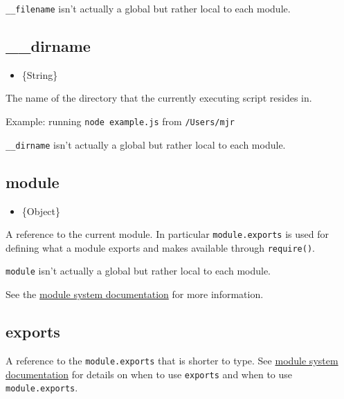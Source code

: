 \texttt{\_\_filename} isn't actually a global but rather local to each
module.

\subsection{\_\_dirname}\label{dirname}

\begin{itemize}
\itemsep1pt\parskip0pt
\item
  \{String\}
\end{itemize}

The name of the directory that the currently executing script resides
in.

Example: running \texttt{node example.js} from \texttt{/Users/mjr}

\begin{Shaded}
\begin{Highlighting}[]
\end{Highlighting}
\end{Shaded}

\texttt{\_\_dirname} isn't actually a global but rather local to each
module.

\subsection{module}\label{module}

\begin{itemize}
\itemsep1pt\parskip0pt
\item
  \{Object\}
\end{itemize}

A reference to the current module. In particular \texttt{module.exports}
is used for defining what a module exports and makes available through
\texttt{require()}.

\texttt{module} isn't actually a global but rather local to each module.

See the \href{modules.html}{module system documentation} for more
information.

\subsection{exports}\label{exports}

A reference to the \texttt{module.exports} that is shorter to type. See
\href{modules.html}{module system documentation} for details on when to
use \texttt{exports} and when to use \texttt{module.exports}.

